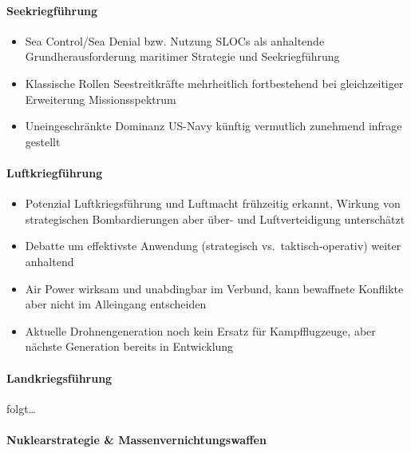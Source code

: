 {}\documentclass[a4paper]{article}
\providecommand{\tightlist}{\setlength{\itemsep}{1mm}\setlength{\parskip}{1mm}}
\begin{document}
\paragraph{Seekriegführung}\label{seekriegfuxfchrung}

\begin{itemize}
	\tightlist
	\item
	      Sea Control/Sea Denial bzw. Nutzung SLOCs als anhaltende
	      Grundherausforderung maritimer Strategie und Seekriegführung
	\item
	      Klassische Rollen Seestreitkräfte mehrheitlich fortbestehend bei
	      gleichzeitiger Erweiterung Missionsspektrum
	\item
	      Uneingeschränkte Dominanz US-Navy künftig vermutlich zunehmend infrage
	      gestellt
\end{itemize}

\paragraph{Luftkriegführung}\label{luftkriegfuxfchrung}

\begin{itemize}
	\tightlist
	\item
	      Potenzial Luftkriegsführung und Luftmacht frühzeitig erkannt, Wirkung
	      von strategischen Bombardierungen aber über- und Luftverteidigung
	      unterschätzt
	\item
	      Debatte um effektivste Anwendung (strategisch vs.~taktisch-operativ)
	      weiter anhaltend
	\item
	      Air Power wirksam und unabdingbar im Verbund, kann bewaffnete
	      Konflikte aber nicht im Alleingang entscheiden
	\item
	      Aktuelle Drohnengeneration noch kein Ersatz für Kampfflugzeuge, aber
	      nächste Generation bereits in Entwicklung
\end{itemize}

\paragraph{Landkriegsführung}\label{landkriegsfuxfchrung}

folgt\ldots{}

\paragraph{Nuklearstrategie \&
	Massenvernichtungswaffen}\label{nuklearstrategie-massenvernichtungswaffen}
\end{document}
